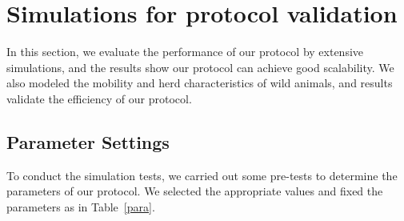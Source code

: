 \section{Simulations for protocol validation}
\label{Simulations}
In this section,
we evaluate the performance of our protocol by extensive simulations, 
and the results show our protocol can achieve good scalability. 
We also modeled the mobility and herd characteristics of wild animals,
and results validate the efficiency of our protocol.

\subsection{Parameter Settings}

To conduct the simulation tests, we carried out some pre-tests to determine the 
parameters of our protocol.
We selected the appropriate values and fixed the parameters as in Table~\ref{para}.

\begin{table}[htbp]
	\caption{Parameter Settings}
	\label{para}
	\centering
\end{table}

